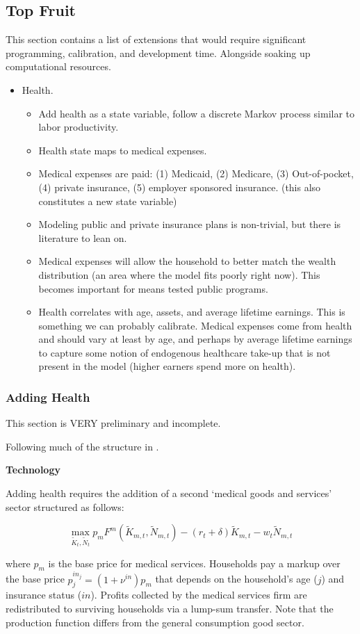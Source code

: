 \documentclass[11pt,leqno,fleqn]{article}
\newcommand{\be}{\vspace{-1em}\begin{singlespace}\begin{equation}}
\newcommand{\ee}{\end{equation}\end{singlespace}}
\begin{document}
\subsection{Top Fruit}
This section contains a list of extensions that would require significant programming, calibration, and development time. Alongside soaking up computational resources.

\begin{itemize}
	\item Health.
	\begin{itemize}
		\item Add health as a state variable, follow a discrete Markov process similar to labor productivity.
		\item Health state maps to medical expenses.
		\item Medical expenses are paid: (1) Medicaid, (2) Medicare, (3) Out-of-pocket, (4) private insurance, (5) employer sponsored insurance. (this also constitutes a new state variable)
		\item Modeling public and private insurance plans is non-trivial, but there is literature to lean on.
		\item Medical expenses will allow the household to better match the wealth distribution (an area where the model fits poorly right now). This becomes important for means tested public programs.
		\item Health correlates with age, assets, and average lifetime earnings. This is something we can probably calibrate. Medical expenses come from health and should vary at least by age, and perhaps by average lifetime earnings to capture some notion of endogenous healthcare take-up that is not present in the model (higher earners spend more on health).
	\end{itemize}
\end{itemize}


\subsubsection{Adding Health}

\begin{center}
\Large This section is VERY  preliminary and incomplete.
\end{center}
\normalsize

Following much of the structure in \citet{Jung:2017}.

\begin{flushleft}
\textbf{Technology}
\end{flushleft}
Adding health requires the addition of a second `medical goods and services' sector structured as follows:
\be \max_{\tilde{K}_{t},\tilde{N}_{t}}p_mF^m(\tilde{K}_{m,t},\tilde{N}_{m,t})-(r_{t}+\delta)\tilde{K}_{m,t}-w_{t}\tilde{N}_{m,t} \ee
where $p_m$ is the base price for medical services. Households pay a markup over the base price $p_j^{in_j}=(1+\nu^{in})p_m$ that depends on the household's age ($j$) and insurance status ($in$). Profits collected by the medical services firm are redistributed to surviving households via a lump-sum transfer. Note that the production function differs from the general consumption good sector.
\end{document}
